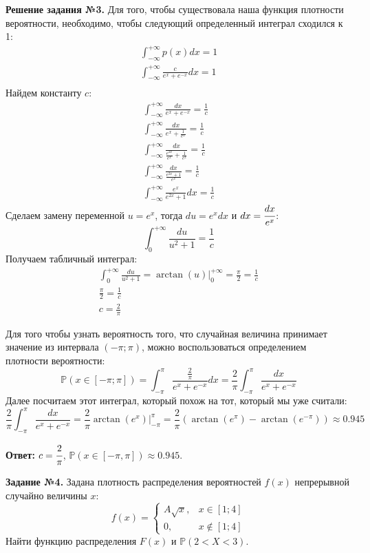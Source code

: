 \documentclass[a4paper, 12pt]{article}
\begin{document}
\textbf{Решение задания №3.} Для того, чтобы существовала наша функция плотности вероятности, необходимо, чтобы следующий определенный интеграл сходился к 1:
\begin{gather*}
    \int_{-\infty}^{+\infty} p(x) dx = 1 \\ 
    \int_{-\infty}^{+\infty} \frac{c}{e^x + e^{-x}} dx = 1 \\ 
\end{gather*}
Найдем константу $c$:
\begin{gather*}
    \int_{-\infty}^{+\infty} \frac{dx}{e^x + e^{-x}} = \frac{1}{c} \\ 
    \int_{-\infty}^{+\infty} \frac{dx}{e^x + \frac{1}{e^x}} = \frac{1}{c} \\ 
    \int_{-\infty}^{+\infty} \frac{dx}{\frac{e^{2x}}{e^x} + \frac{1}{e^x}} = \frac{1}{c} \\ 
    \int_{-\infty}^{+\infty} \frac{dx}{\frac{e^{2x} + 1}{e^x}} = \frac{1}{c} \\
    \int_{-\infty}^{+\infty} \frac{e^x}{e^{2x} + 1} dx = \frac{1}{c}
\end{gather*}
Сделаем замену переменной $u = e^x$, тогда $du = e^x dx$ и $dx = \cfrac{dx}{e^x}$:
\[
    \int_{0}^{+\infty} \frac{du}{u^2 + 1} = \frac{1}{c}
\]
Получаем табличный интеграл:
\begin{gather*}
    \int_{0}^{+\infty} \frac{du}{u^2 + 1} = \arctan(u) \Big |_{0}^{+\infty} = \frac{\pi}{2} = \frac{1}{c} \\ 
    \frac{\pi}{2} = \frac{1}{c} \\ 
    c = \frac{2}{\pi}
\end{gather*}

Для того чтобы узнать вероятность того, что случайная величина принимает значение из интервала $(-\pi; \pi)$, можно воспользоваться определением плотности вероятности:
\[
    \mathbb{P}(x \in [-\pi; \pi]) = \int_{-\pi}^{\pi} \frac{\frac{2}{\pi}}{e^x + e^{-x}} dx = \frac{2}{\pi} \int_{-\pi}^{\pi} \frac{dx}{e^x + e^{-x}}
\]
Далее посчитаем этот интеграл, который похож на тот, который мы уже считали:
\[
    \frac{2}{\pi} \int_{-\pi}^{\pi} \frac{dx}{e^x + e^{-x}} = \frac{2}{\pi} \arctan{(e^x)} \Big |_{-\pi}^{\pi} = \frac{2}{\pi} (\arctan{(e^{\pi})} - \arctan{(e^{-\pi})}) \approx 0.945
\]


\textbf{Ответ:} $c = \cfrac{2}{\pi}$, $\mathbb{P}(x \in [-\pi, \pi]) \approx 0.945$.

\newpage

\textbf{Задание №4.} Задана плотность распределения вероятностей $f(x)$ непрерывной случайно величины $x$:
\[
f(x) = 
\begin{cases}
    A \sqrt{x}, & x \in [1; 4] \\ 
    0, & x \not \in [1; 4]
\end{cases}
\]
Найти функцию распределения $F(x)$ и $\mathbb{P}(2 < X < 3)$.
\vspace{0.5cm}
\end{document}
